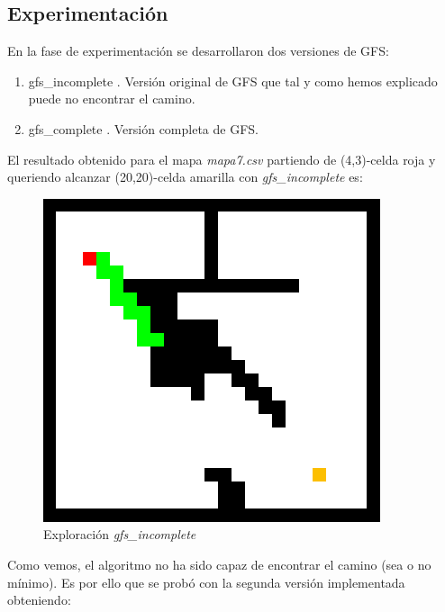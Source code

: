 \documentclass[conference]{IEEEtran}
\begin{document}
{\subsection{Experimentación}

En la fase de experimentación se desarrollaron dos versiones de GFS:
\begin{enumerate}
\item gfs\_incomplete . Versión original de GFS que tal y como hemos explicado puede no encontrar el camino.
\item gfs\_complete . Versión completa de GFS.
\end{enumerate}

El resultado obtenido para el mapa \textit{mapa7.csv} partiendo de (4,3)-celda roja y queriendo alcanzar (20,20)-celda amarilla con \textit{gfs\_incomplete} es:

\begin{figure}[H]
\centering
\includegraphics[scale=0.4]{IMAGENES/gfsESTANCADO2.png}
\caption{Exploración \textit{gfs\_incomplete}}
\label{fig}
\end{figure}

Como vemos, el algoritmo no ha sido capaz de encontrar el camino (sea o no mínimo). Es por ello que se probó con la segunda versión implementada obteniendo:

}
\end{document}

